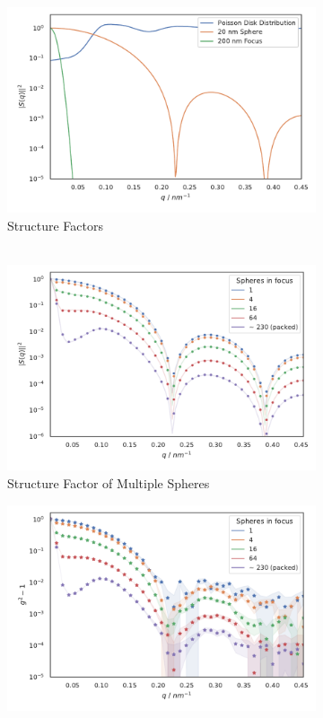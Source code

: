  
\begin{figure}
	\centering
	\begin{subfigure}[b]{0.32\textwidth}
		\includegraphics[width=\linewidth]{images/multisphere1.pdf}
		\caption{Structure Factors\\$ $}
		\label{fig:multisphere1}
	\end{subfigure}
	\begin{subfigure}[b]{0.32\textwidth}
		\includegraphics[width=\linewidth]{images/multisphere3.pdf}
		\caption{Structure Factor of Multiple Spheres}
		\label{fig:multisphere3}
	\end{subfigure}
	\begin{subfigure}[b]{0.32\textwidth}
		\includegraphics[width=\linewidth]{images/multisphere2.pdf}

\end{subfigure}
\end{figure}
